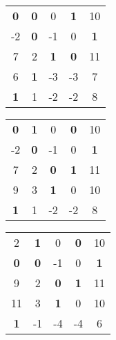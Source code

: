 \documentclass{report}
\begin{document}
 \begin{tabular}{ccccc|}
  \textbf{0} & \textbf{0} & 0 & \textbf{1} & 10\\
   -2 & \textbf{0} & -1 & 0 & \textbf{1}\\
   7 & 2 & \textbf{1} & \textbf{0} & 11\\
   6 & \textbf{1} & -3 & -3 & 7\\
   \textbf{1} & 1 & -2 & -2 & 8\\
   \hline
 \end{tabular}

 \vspace*{1em}

 \begin{tabular}{ccccc|}
  \textbf{0} & \textbf{1} & 0 & \textbf{0} & 10\\
   -2 & \textbf{0} & -1 & 0 & \textbf{1}\\
   7 & 2 & \textbf{0} & \textbf{1} & 11\\
   9 & 3 & \textbf{1} & 0 & 10\\
   \textbf{1} & 1 & -2 & -2 & 8\\
   \hline
 \end{tabular}

 \vspace*{1em}

 \begin{tabular}{ccccc|}
  2 & \textbf{1} & 0 & \textbf{0} & 10\\
   \textbf{0} & \textbf{0} & -1 & 0 & \textbf{1}\\
   9 & 2 & \textbf{0} & \textbf{1} & 11\\
   11 & 3 & \textbf{1} & 0 & 10\\
   \textbf{1} & -1 & -4 & -4 & 6\\
   \hline
 \end{tabular}
\end{document}
